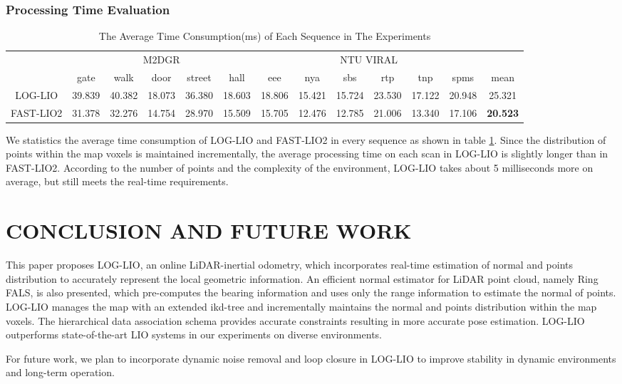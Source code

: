 \documentclass[letterpaper, 10 pt, conference]{ieeeconf}  %
\begin{document}
\subsubsection{Processing Time Evaluation}
\begin{table}[htb!]
        \caption{The Average Time Consumption(ms) of Each Sequence in The Experiments}
        \centering
        \begin{tabular}{c|c|c|c|c|c|c|c|c|c|c|c|c}
                \toprule
                {}        & \multicolumn{5}{c|}{M2DGR} & \multicolumn{6}{c|}{NTU VIRAL} &                                                                                                  \\
                {}        & gate                       & walk                           & door   & street & hall   & eee    & nya    & sbs    & rtp    & tnp    & spms   & mean            \\
                \midrule
                LOG-LIO   & 39.839                     & 40.382                         & 18.073 & 36.380 & 18.603 & 18.806 & 15.421 & 15.724 & 23.530 & 17.122 & 20.948 & 25.321          \\
                FAST-LIO2 & 31.378                     & 32.276                         & 14.754 & 28.970 & 15.509 & 15.705 & 12.476 & 12.785 & 21.006 & 13.340 & 17.106 & \textbf{20.523} \\
                \bottomrule
        \end{tabular}
        \label{tab_lio_time}
\end{table}
We statistics the average time consumption of LOG-LIO and FAST-LIO2 in every sequence as shown in table \ref{tab_lio_time}.
Since the distribution of points within the map voxels is maintained incrementally, the average processing time on each scan in LOG-LIO is slightly longer than in FAST-LIO2.
According to the number of points and the complexity of the environment, LOG-LIO takes about 5 milliseconds more on average, but still meets the real-time requirements.

\section{CONCLUSION AND FUTURE WORK}
\label{sec:conclusion_and_future_work}
This paper proposes LOG-LIO, an online LiDAR-inertial odometry, which incorporates real-time estimation of normal and points distribution to accurately represent the local geometric information.
An efficient normal estimator for LiDAR point cloud, namely Ring FALS, is also presented, which pre-computes the bearing information and uses only the range information to estimate the normal of points. 
LOG-LIO manages the map with an extended ikd-tree and incrementally maintains the normal and points distribution within the map voxels. 
The hierarchical data association schema provides accurate constraints resulting in more accurate pose estimation. 
LOG-LIO outperforms state-of-the-art LIO systems in our experiments on diverse environments. 

For future work, we plan to incorporate dynamic noise removal and loop closure in LOG-LIO to improve stability in dynamic environments and long-term operation.



\end{document}
